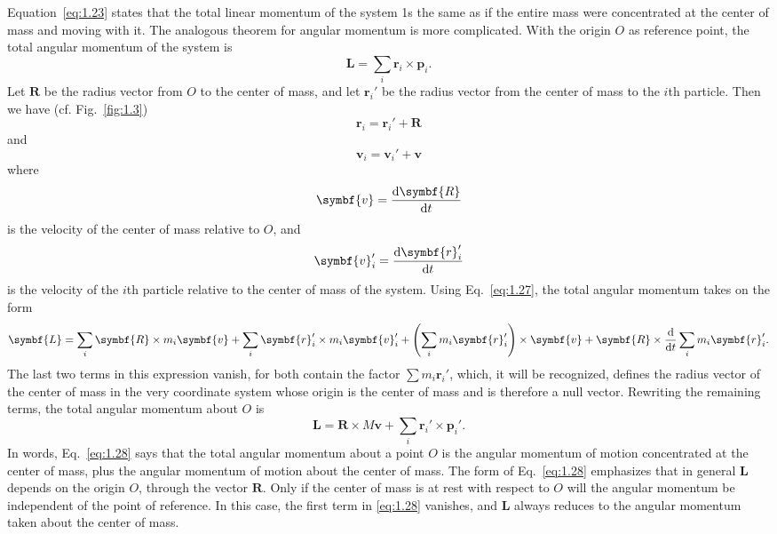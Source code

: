 Equation~\eqref{eq:1.23} states that the total linear momentum of the system 1s the same as if the entire mass were concentrated at the center of mass and moving with it. The analogous theorem for angular momentum is more complicated. With the origin \(O\) as reference point, the total angular momentum of the system is
\begin{equation*}
    \symbf{L}=\sum_i\symbf{r}_i\times\symbf{p}_i.
\end{equation*}
Let \(\symbf{R}\) be the radius vector from \(O\) to the center of mass, and let \(\symbf{r}_i'\) be the radius vector from the center of mass to the \(i\)th particle. Then we have (cf. Fig.~\ref{fig:1.3})
\begin{equation}
    \symbf{r}_i=\symbf{r}_i'+\symbf{R}\label{eq:1.27}
\end{equation}
and
\begin{equation*}
    \symbf{v}_i=\symbf{v}_i'+\symbf{v}
\end{equation*}
where
\begin{equation*}
    \symbf{v}=\odv{\symbf{R}}{t}
\end{equation*}
is the velocity of the center of mass relative to \(O\), and
\begin{equation*}
    \symbf{v}_i'=\odv{\symbf{r}_i'}{t}
\end{equation*}
is the velocity of the \(i\)th particle relative to the center of mass of the system. Using Eq.~\eqref{eq:1.27}, the total angular momentum takes on the form
\begin{equation*}
    \symbf{L}=\sum_i\symbf{R}\times m_i\symbf{v}+\sum_i\symbf{r}_i'\times m_i\symbf{v}_i'+\left(\sum_im_i\symbf{r}_i'\right)\times\symbf{v}+\symbf{R}\times\odv*{\sum_im_i\symbf{r}_i'}{t}.
\end{equation*}
The last two terms in this expression vanish, for both contain the factor \(\sum m_i\symbf{r}_i'\), which, it will be recognized, defines the radius vector of the center of mass in the very coordinate system whose origin is the center of mass and is therefore a null vector. Rewriting the remaining terms, the total angular momentum about \(O\) is
\begin{equation}
    \symbf{L}=\symbf{R}\times M\symbf{v}+\sum_i\symbf{r}_i'\times\symbf{p}_i'.\label{eq:1.28}
\end{equation}
In words, Eq.~\eqref{eq:1.28} says that the total angular momentum about a point \(O\) is the angular momentum of motion concentrated at the center of mass, plus the angular momentum of motion about the center of mass. The form of Eq.~\eqref{eq:1.28} emphasizes that in general \(\symbf{L}\) depends on the origin \(O\), through the vector \(\symbf{R}\). Only if the center of mass is at rest with respect to \(O\) will the angular momentum be independent of the point of reference. In this case, the first term in \eqref{eq:1.28} vanishes, and \(\symbf{L}\) always reduces to the angular momentum taken about the center of mass.

